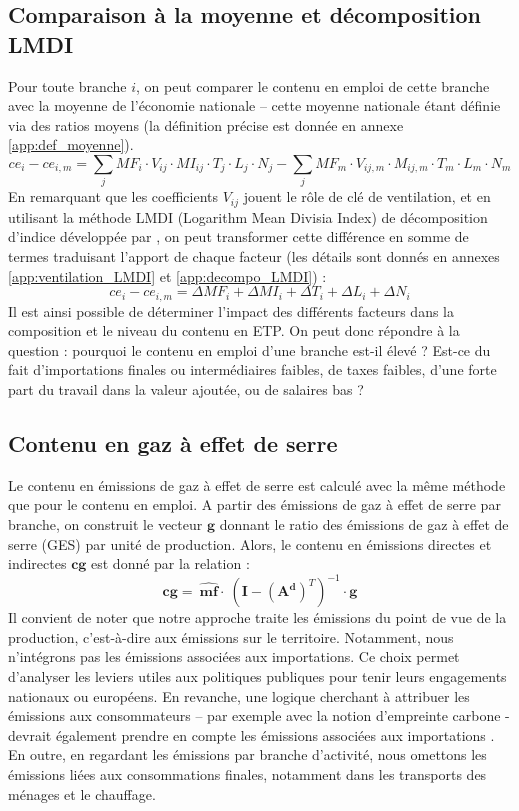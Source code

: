 \subsection{Comparaison à la moyenne et décomposition LMDI}
Pour toute branche $i$, on peut comparer le contenu en emploi de cette branche avec la moyenne de l’économie nationale – cette moyenne nationale étant définie via des ratios moyens (la définition précise est donnée en annexe \ref{app:def_moyenne}).
\begin{equation}
ce_i - ce_{i,m} = \sum_j MF_i \cdot V_{ij} \cdot MI_{ij} \cdot T_j \cdot L_j \cdot N_j - \sum_j MF_m \cdot V_{ij,m} \cdot M_{ij,m} \cdot T_m \cdot L_m \cdot N_m
\end{equation}
En remarquant que les coefficients $V_{ij}$ jouent le rôle de clé de ventilation, et en utilisant la méthode LMDI (Logarithm Mean Divisia Index) de décomposition d’indice développée par \citet{Ang2005}, on peut transformer cette différence en somme de termes traduisant l’apport de chaque facteur (les détails sont donnés en annexes \ref{app:ventilation_LMDI} et \ref{app:decompo_LMDI}) :
\begin{equation}
ce_i - ce_{i,m} = \Delta MF_i + \Delta MI_i + \Delta T_i +\Delta L_i + \Delta N_i
\end{equation}
Il est ainsi possible de déterminer l’impact des différents facteurs dans la composition et le niveau du contenu en ETP. On peut donc répondre à la question : pourquoi le contenu en emploi d’une branche est-il élevé ? Est-ce du fait d’importations finales ou intermédiaires faibles, de taxes faibles, d’une forte part du travail dans la valeur ajoutée, ou de salaires bas ?


\subsection{Contenu en gaz à effet de serre}
Le contenu en émissions de gaz à effet de serre est calculé avec la même méthode que pour le contenu en emploi. A partir des émissions de gaz à effet de serre par branche, on construit le vecteur $\pmb{g}$ donnant le ratio des émissions de gaz à effet de serre (GES) par unité de production. Alors, le contenu en émissions directes et indirectes $\pmb{cg}$ est donné par la relation :
\begin{equation}
\pmb{cg} =~\widehat{\pmb{mf}} \cdot~(\pmb{I} - (\pmb{A^d})^T)^{-1} \cdot \pmb{g}
\end{equation}
Il convient de noter que notre approche traite les émissions du point de vue de la production, c’est-à-dire aux émissions sur le territoire. Notamment, nous n’intégrons pas les émissions associées aux importations. Ce choix permet d’analyser les leviers utiles aux politiques publiques pour tenir leurs engagements nationaux ou européens. En revanche, une logique cherchant à attribuer les émissions aux consommateurs – par exemple avec la notion d’empreinte carbone - devrait également prendre en compte les émissions associées aux importations \citep{Pasquier2012}. En outre, en regardant les émissions par branche d’activité, nous omettons les émissions liées aux consommations finales, notamment dans les transports des ménages et le chauffage. 


